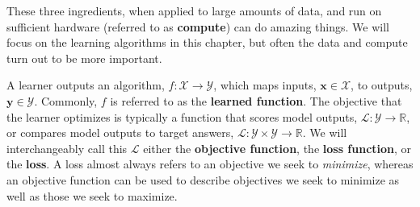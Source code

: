 These three ingredients, when applied to large amounts of data, and run on sufficient hardware (referred to as {\bf compute}) can do amazing things. We will focus on the learning algorithms in this chapter, but often the data and compute turn out to be more important.

\begin{center}
\end{center}


A learner outputs an algorithm, $f: \mathcal{X} \rightarrow \mathcal{Y}$, which maps inputs, $\mathbf{x} \in \mathcal{X}$, to outputs, $\mathbf{y} \in \mathcal{Y}$. Commonly, $f$ is referred to as the \textbf{learned function}. The objective that the learner optimizes is typically a function that scores model outputs, $\mathcal{L}: \mathcal{Y} \rightarrow \mathbb{R}$, or compares model outputs to target answers, $\mathcal{L}: \mathcal{Y} \times \mathcal{Y} \rightarrow \mathbb{R}$. We will interchangeably call this $\mathcal{L}$ either the \textbf{objective function}, the \textbf{loss function}, or the \textbf{loss}. A loss almost always refers to an objective we seek to \textit{minimize}, whereas an objective function can be used to describe objectives we seek to minimize as well as those we seek to maximize.

